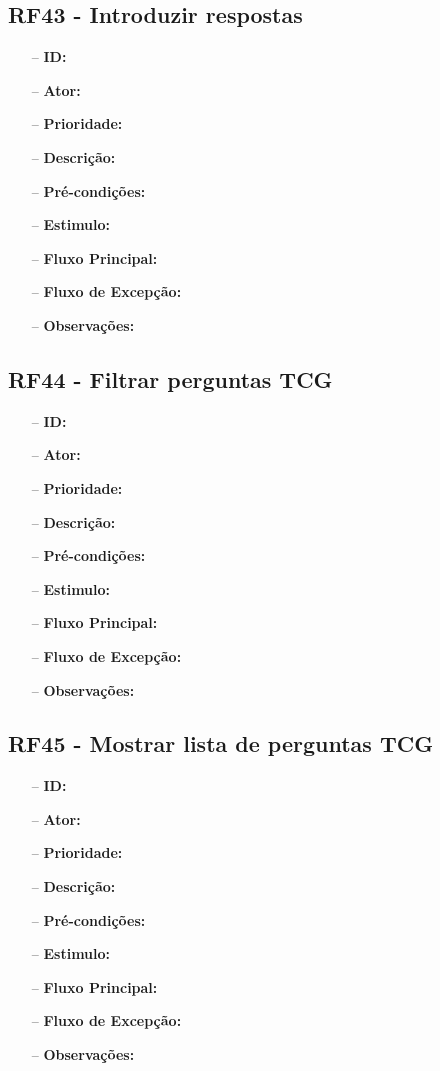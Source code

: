 \subsection{RF43 - Introduzir respostas}
\begin{itemize}
	\item[--] \textbf{ID:} 
	\item[--]  \textbf{Ator:} 
	\item[--]  \textbf{Prioridade:} 
	\item[--]  \textbf{Descrição:} 
	\item[--]  \textbf{Pré-condições:} 
	\item[--]  \textbf{Estimulo:}
	\item[--]  \textbf{Fluxo Principal:} 
	\subitem
	\subitem
	\subitem
	\subitem
	\item[--]  \textbf{Fluxo de Excepção:} 
	\subitem
	\subitem
	\subitem
	\subitem
	\item[--]  \textbf{Observações:} 
\end{itemize}
\newpage

\subsection{RF44 - Filtrar perguntas TCG}
\begin{itemize}
	\item[--] \textbf{ID:} 
	\item[--]  \textbf{Ator:} 
	\item[--]  \textbf{Prioridade:} 
	\item[--]  \textbf{Descrição:} 
	\item[--]  \textbf{Pré-condições:} 
	\item[--]  \textbf{Estimulo:}
	\item[--]  \textbf{Fluxo Principal:} 
	\subitem
	\subitem
	\subitem
	\subitem
	\item[--]  \textbf{Fluxo de Excepção:} 
	\subitem
	\subitem
	\subitem
	\subitem
	\item[--]  \textbf{Observações:} 
\end{itemize}
\newpage

\subsection{RF45 - Mostrar lista de perguntas TCG}
\begin{itemize}
	\item[--] \textbf{ID:} 
	\item[--]  \textbf{Ator:} 
	\item[--]  \textbf{Prioridade:} 
	\item[--]  \textbf{Descrição:} 
	\item[--]  \textbf{Pré-condições:} 
	\item[--]  \textbf{Estimulo:}
	\item[--]  \textbf{Fluxo Principal:} 
	\subitem
	\subitem
	\subitem
	\subitem
	\item[--]  \textbf{Fluxo de Excepção:} 
	\subitem
	\subitem
	\subitem
	\subitem
	\item[--]  \textbf{Observações:} 
\end{itemize}
\newpage

